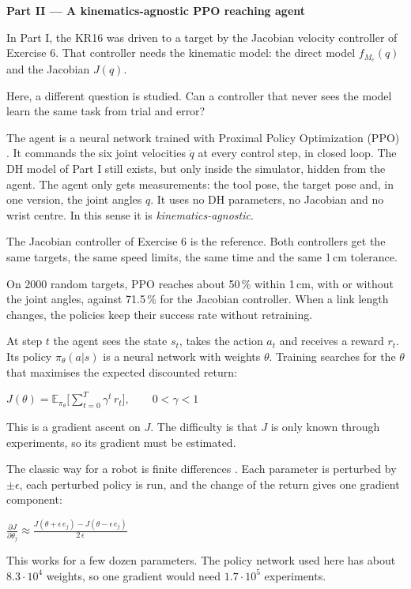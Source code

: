 \documentclass[10pt,a4paper]{article}
\newenvironment{eq}{\vspace{-5pt}\begin{center}$\displaystyle}{$\end{center}\vspace{-6pt}}
\newcommand{\head}[1]{\vspace{4pt}{\large\bfseries #1}\par}
\newcommand{\sub}[1]{\vspace{1pt}{\bfseries #1}\par}
\begin{document}
{\Large\bfseries Part II --- A kinematics-agnostic PPO reaching agent}

\head{1. Goal}
In Part I, the KR16 was driven to a target by the Jacobian velocity controller of Exercise 6.
That controller needs the kinematic model: the direct model $f_{M_e}(q)$ and the Jacobian $J(q)$.

Here, a different question is studied.
Can a controller that never sees the model learn the same task from trial and error?

The agent is a neural network trained with Proximal Policy Optimization (PPO) \cite{ppo}.
It commands the six joint velocities $\dot q$ at every control step, in closed loop.
The DH model of Part I still exists, but only inside the simulator, hidden from the agent.
The agent only gets measurements: the tool pose, the target pose and, in one version, the joint angles $q$.
It uses no DH parameters, no Jacobian and no wrist centre.
In this sense it is \emph{kinematics-agnostic}.

The Jacobian controller of Exercise 6 is the reference.
Both controllers get the same targets, the same speed limits, the same time and the same 1\,cm tolerance.

On 2000 random targets, PPO reaches about 50\,\% within 1\,cm, with or without the joint angles, against 71.5\,\% for the Jacobian controller.
When a link length changes, the policies keep their success rate without retraining.

\head{2. Working principle of PPO}
\sub{2.1 The problem}
At step $t$ the agent sees the state $s_t$, takes the action $a_t$ and receives a reward $r_t$.
Its policy $\pi_\theta(a|s)$ is a neural network with weights $\theta$.
Training searches for the $\theta$ that maximises the expected discounted return:
\begin{eq}
J(\theta) = \mathbb{E}_{\pi_\theta}\Big[\sum_{t=0}^{T} \gamma^t\, r_t\Big], \qquad 0<\gamma<1
\end{eq}
This is a gradient ascent on $J$.
The difficulty is that $J$ is only known through experiments, so its gradient must be estimated.

\sub{2.2 From finite differences to the likelihood ratio}
The classic way for a robot is finite differences \cite{kohl}.
Each parameter is perturbed by $\pm\epsilon$, each perturbed policy is run, and the change of the return gives one gradient component:
\begin{eq}
\frac{\partial J}{\partial \theta_j} \approx \frac{J(\theta + \epsilon\, e_j) - J(\theta - \epsilon\, e_j)}{2\,\epsilon}
\end{eq}
This works for a few dozen parameters.
The policy network used here has about $8.3\cdot 10^4$ weights, so one gradient would need $1.7\cdot 10^5$ experiments.
\end{document}

